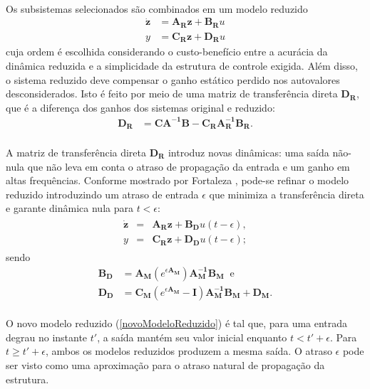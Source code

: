 \paragraph{} Os subsistemas selecionados são combinados em um modelo reduzido \begin{align}
	\mathbf{\dot{z}} &= \mathbf{A_R}\mathbf{z}+\mathbf{B_R}u\\
	y &= \mathbf{C_R}\mathbf{z}+\mathbf{D_R}u
\end{align} cuja ordem é escolhida considerando o custo-benefício entre a acurácia da dinâmica reduzida e a simplicidade da estrutura de controle exigida. Além disso, o sistema reduzido deve compensar o ganho estático perdido nos autovalores desconsiderados. Isto é feito por meio de uma matriz de transferência direta $\mathbf{D_R}$, que é a diferença dos ganhos dos sistemas original e reduzido: \begin{align}
	\mathbf{D_R}&=\mathbf{C}\mathbf{A^{-1}}\mathbf{B}-\mathbf{C_R}\mathbf{A_R^{-1}}\mathbf{B_R}.
\end{align}


\paragraph{} A matriz de transferência direta $\mathbf{D_R}$ introduz novas dinâmicas: uma saída não-nula que não leva em conta o atraso de propagação da entrada e um ganho em altas frequências. Conforme mostrado por Fortaleza \cite{teseEugenio}, pode-se refinar o modelo reduzido introduzindo um atraso de entrada $\epsilon$ que minimiza a transferência direta e garante dinâmica nula para $t < \epsilon$: \begin{align}
\begin{array}{lll}
	\mathbf{\dot{z}} &=& \mathbf{A_R}\mathbf{z}+\mathbf{B_D}u(t-\epsilon),\\
	y &=& \mathbf{C_R}\mathbf{z}+\mathbf{D_D}u(t-\epsilon) \label{novoModeloReduzido};
\end{array}
\end{align} sendo \begin{align}
	\mathbf{B_D} &= \mathbf{A_M}\left(e^{\epsilon\mathbf{A_M}}\right)\mathbf{A_M^{-1}}\mathbf{B_M}\;\;\mathrm{e}\\
	\mathbf{D_D} &= \mathbf{C_M}\left(e^{\epsilon\mathbf{A_M}} - \mathbf{I}\right)\mathbf{A_M^{-1}}\mathbf{B_M} + \mathbf{D_M}.
\end{align}

\paragraph{} O novo modelo reduzido (\ref{novoModeloReduzido}) é tal que, para uma entrada degrau no instante $t'$, a saída mantém seu valor inicial enquanto $t < t' + \epsilon$. Para $t \ge t' + \epsilon$, ambos os modelos reduzidos produzem a mesma saída. O atraso $\epsilon$ pode ser visto como uma aproximação para o atraso natural de propagação da estrutura.

